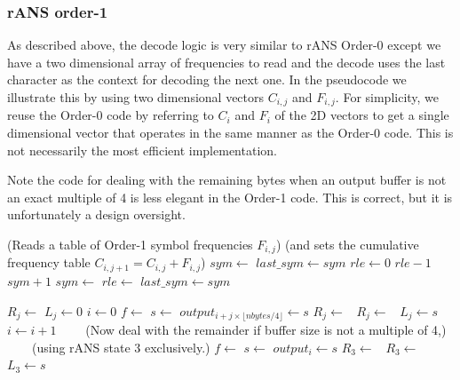 \documentclass[a4paper]{article}
\begin{document}
\subsubsection*{rANS order-1}

As described above, the decode logic is very similar to rANS Order-0 except we have a two dimensional array of frequencies to read and the decode uses the last character as the context for decoding the next one.
In the pseudocode we illustrate this by using two dimensional vectors $C_{i,j}$ and $F_{i,j}$.
For simplicity, we reuse the Order-0 code by referring to $C_i$ and $F_i$ of the 2D vectors to get a single dimensional vector that operates in the same manner as the Order-0 code.
This is not necessarily the most efficient implementation.

Note the code for dealing with the remaining bytes when an output buffer is not an exact multiple of 4 is less elegant in the Order-1 code.
This is correct, but it is unfortunately a design oversight.

\vskip 0.5cm

\begin{algorithmic}[1]
\Statex (Reads a table of Order-1 symbol frequencies $F_{i,j}$)
\Statex (and sets the cumulative frequency table $C_{i,j+1} = C_{i,j}+F_{i,j}$)
\State $sym \gets$ 
\State $last\_sym \gets sym$
\State $rle \gets 0$
\Repeat
  \State {}
    \settowidth{\maxwidth}{sym}
    \State {} $rle-1$
    \State {} $sym+1$
  \Else
    \State $sym \gets$ 
      \State $rle \gets$ 
    \EndIf
  \EndIf
  \State $last\_sym \gets sym$
\EndProcedure

\Statex
{}
  \State {}
    \State $R_j \gets$ 
    \State $L_j \gets 0$
  \EndFor
  \State $i \gets 0$
      \State $f \gets$ 
      \State $s \gets$ 
      \State $output_{i + j \times \lfloor nbytes/4 \rfloor} \gets s$
      \State $R_j \gets$\ 
      \State $R_j \gets$\ 
      \State $L_j \gets s$
    \EndFor
    \State $i \gets i+1$
  \EndWhile
  \Statex \ \ \ \ (Now deal with the remainder if buffer size is not a multiple of 4,)
  \Statex \ \ \ \ (using rANS state 3 exclusively.)
    \State $f \gets$ 
    \State $s \gets$ 
    \State $output_i \gets s$
    \State $R_3 \gets$\ 
    \State $R_3 \gets$\ 
    \State $L_3 \gets s$
  \EndFor
\EndProcedure
\end{algorithmic}
\end{document}
